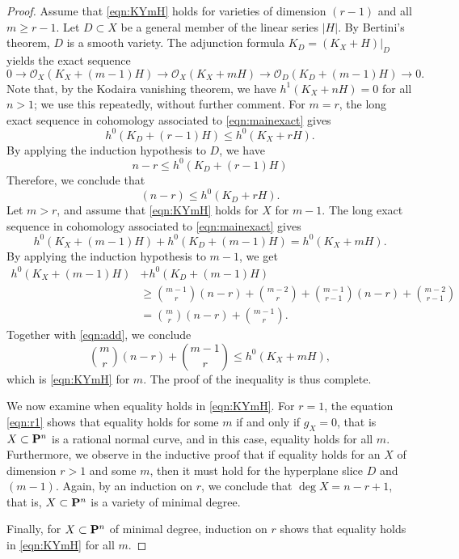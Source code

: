 \documentclass[11pt,reqno]{amsart}
\theoremstyle{plain}
\theoremstyle{definition}
\theoremstyle{remark}
\numberwithin{equation}{section}
\renewcommand{\to}{{\longrightarrow}}
\numberwithin{equation}{section}
\renewcommand{\O}{\mathcal O}
\begin{document}
\begin{proof}
  Assume that \eqref{eqn:KYmH} holds for varieties of dimension $(r-1)$ and all $m \geq r-1$.
  Let $D \subset X$ be a general member of the linear series $|H|$.
  By Bertini's theorem, $D$ is a smooth variety.
  The adjunction formula $K_D = (K_X + H)|_D$ yields the exact sequence
  \begin{equation}\label{eqn:mainexact}
    0 \to \O_X(K_X + (m-1)H) \to \O_X(K_X + mH) \to \O_D(K_D + (m-1)H) \to 0.
  \end{equation}
  Note that, by the Kodaira vanishing theorem, we have $h^1(K_X + nH) = 0$ for all $n > 1$; we use this repeatedly, without further comment.
  For $m = r$, the long exact sequence in cohomology associated to \eqref{eqn:mainexact} gives
  \[ h^0(K_D + (r-1)H) \leq h^0(K_X + rH).\]
  By applying the induction hypothesis to $D$, we have
  \begin{equation}
    n-r \leq h^0(K_D + (r-1)H)
  \end{equation}
  Therefore, we conclude that
  \begin{equation}
    (n-r) \leq h^0(K_D + rH).
  \end{equation}
  Let $m > r$, and assume that \eqref{eqn:KYmH} holds for $X$ for $m-1$.
  The long exact sequence in cohomology associated to \eqref{eqn:mainexact} gives
  \begin{equation}\label{eqn:add}
    h^0(K_X + (m-1)H) + h^0(K_D + (m-1)H) = h^0(K_X + mH).
  \end{equation}
  By applying the induction hypothesis to $m-1$, we get
  \begin{align*}
    h^0(K_X + (m-1)H) &+ h^0(K_D + (m-1)H)\\
                      &\geq{{m-1} \choose r}(n-r) + {{m-2} \choose {r}} + {{m-1} \choose {r-1}}(n-r) + {{m-2} \choose r-1} \\
                      &={m \choose r} (n-r) + {{m-1} \choose r}.
  \end{align*}
  Together with \eqref{eqn:add}, we conclude 
  \begin{equation}
    {m \choose r} (n-r) + {{m-1} \choose r} \leq h^0(K_X + mH), 
  \end{equation}
  which is \eqref{eqn:KYmH} for $m$.
  The proof of the inequality is thus complete.

  We now examine when equality holds in \eqref{eqn:KYmH}.
  For $r = 1$, the equation \eqref{eqn:r1} shows that equality holds for some $m$ if and only if $g_X = 0$, that is $X \subset \P^n$ is a rational normal curve, and in this case, equality holds for all $m$.
  Furthermore, we observe in the inductive proof that if equality holds for an $X$ of dimension $r > 1$ and some $m$, then it must hold for the hyperplane slice $D$ and $(m-1)$.
  Again, by an induction on $r$, we conclude that $\deg X = n-r+1$, that is, $X \subset \P^n$ is a variety of minimal degree.

  Finally, for $X \subset \P^n$ of minimal degree, induction on $r$ shows that equality holds in \eqref{eqn:KYmH} for all $m$.
\end{proof}
\end{document}
